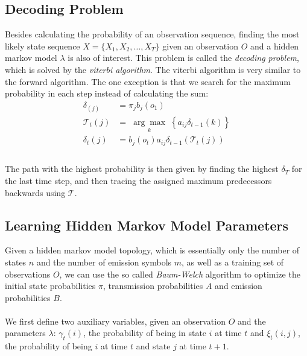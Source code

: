 \subsection{Decoding Problem}
Besides calculating the probability of an observation sequence, finding the most likely state sequence $X = \{X_1, X_2, \dots, X_T\}$ given an observation $O$ and a hidden markov model $\lambda$ is also of interest. 
This problem is called the \textit{decoding problem}, which is solved by the \textit{viterbi algorithm}. The viterbi algorithm is very similar to the forward algorithm. The one exception is that we search for the maximum probability in each step instead of calculating the sum: \\
\begin{align*}
\delta_(j) &= \pi_j b_j(o_1) \\
\mathcal{T}_t(j) &= \; \underset{k}{\arg \max} \; \left\{  a_{ij}\delta_{t-1}(k) \right\} \\
\delta_t(j) &= b_j(o_t) a_{ij}\delta_{t-1}(\mathcal{T}_t(j)) \\
\end{align*} \\ 
The path with the highest probability is then given by finding the highest $\delta_T$ for the last time step, and then tracing the assigned maximum predecessors backwards using $\mathcal{T}$.
\subsection{Learning Hidden Markov Model Parameters}
\label{sec:learning_hmm}
Given a hidden markov model topology, which is essentially only the number of states $n$ and the number of emission symbols $m$, as well as a training set of observations $O$, we can use the so called \textit{Baum-Welch} algorithm to optimize the initial state probabilities $\pi$, transmission probabilities $A$ and emission probabilities $B$. \\ \\
We first define two auxiliary variables, given an observation $O$ and the parameters $\lambda$: $\gamma_t(i)$, the probability of being in state $i$ at time $t$ and $\xi_t(i, j)$, the probability of being $i$ at time $t$ and state $j$ at time $t + 1$.

